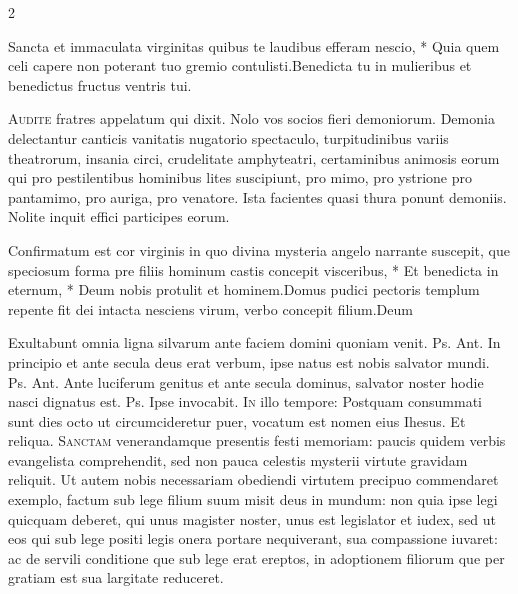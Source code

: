 \begin{multicols*}{2}
\begin{responsory}
{Sancta et immaculata virginitas quibus te laudibus efferam nescio, * Quia quem celi capere non poterant tuo gremio contulisti.}{Benedicta tu in mulieribus et benedictus fructus ventris tui.}
\end{responsory}%
\lettrine[lines=2]{\zallmancaps \color{Blue} A}{udite} fratres appelatum qui dixit. Nolo vos socios fieri demoniorum. Demonia delectantur canticis vanitatis nugatorio spectaculo, turpitudinibus variis theatrorum, insania circi, crudelitate amphyteatri, certaminibus animosis eorum qui pro pestilentibus hominibus lites suscipiunt, pro mimo, pro ystrione pro pantamimo, pro auriga, pro venatore. Ista facientes quasi thura ponunt demoniis. Nolite inquit effici participes eorum.
\begin{responsory-final}
{Confirmatum est cor virginis in quo divina mysteria angelo narrante suscepit, que speciosum forma pre filiis hominum castis concepit visceribus, * Et benedicta in eternum, * Deum nobis protulit et hominem.}{Domus pudici pectoris templum repente fit dei intacta nesciens virum, verbo concepit filium.}{Deum}
\end{responsory-final}%
 Exultabunt omnia ligna silvarum ante faciem domini quoniam venit. {\color{Red} Ps.}  {\color{Red} Ant.} In principio et ante secula deus erat verbum, ipse natus est nobis salvator mundi. {\color{Red} Ps.}  {\color{Red} Ant.} Ante luciferum genitus et ante secula dominus, salvator noster hodie nasci dignatus est. {\color{Red} Ps.}  \V Ipse invocabit.
\lettrine[lines=2]{\zallmancaps \color{Red} I}{n} illo tempore: Postquam consummati sunt dies octo ut circumcideretur puer, vocatum est nomen eius Ihesus. Et reliqua.
 \grecross
\lettrine[lines=2]{\zallmancaps \color{Blue} S}{anctam} venerandamque presentis festi memoriam: paucis quidem verbis evangelista comprehendit, sed non pauca celestis mysterii virtute gravidam reliquit. Ut autem nobis necessariam obediendi virtutem precipuo commendaret exemplo, factum sub lege filium suum misit deus in mundum: non quia ipse legi quicquam deberet, qui unus magister noster, unus est legislator et iudex, sed ut eos qui sub lege positi legis onera portare nequiverant, sua compassione iuvaret: ac de servili conditione que sub lege erat ereptos, in adoptionem filiorum que per gratiam est sua largitate reduceret.

\end{multicols*}
